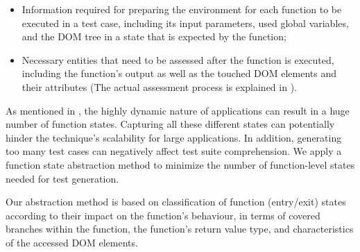 \begin{itemize}[noitemsep]
\item Information required for preparing the environment for each function to be executed in a test case, including its input parameters, used global variables, and the DOM tree in a state that is expected by the function;
\item Necessary entities that need to be assessed after the function is executed, including the function's output as well as the touched DOM elements and their attributes (The actual assessment process is explained in ).
\end{itemize}


As mentioned in , the highly dynamic nature of \javascript applications can result in a huge number of function states. Capturing all these different states can potentially hinder the technique's scalability for large applications. In addition, generating too many test cases can negatively affect test suite comprehension.
We apply a function state abstraction method to minimize the number of function-level states needed for test generation.



Our abstraction method is based on classification of function (entry/exit) states according to their impact on the function's behaviour, in terms of covered branches within the function, the function's return value type, and characteristics of the accessed DOM elements.

